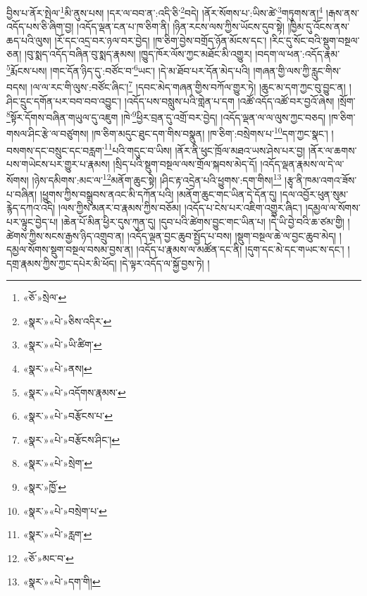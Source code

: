 བྱིས་པ་ནོར་སྤེལ་\footnote{«ཅོ་»སྲེལ་}མི་ནུས་པས། །དར་ལ་བབ་ན་:འདི་ཅི་\footnote{«སྣར་»«པེ་»ཅིས་འདིར་}བདེ། །ནོར་སོགས་པ་:ཡིས་ཚེ་\footnote{«སྣར་»«པེ་»ཡི་ཚིག་}གཏུགས་ན།\footnote{«སྣར་»«པེ་»ནས།} །རྒས་ནས་འདོད་པས་ཅི་ཞིག་བྱ། །འདོད་ལྡན་ངན་པ་ཁ་ཅིག་ནི། །ཉིན་རངས་ལས་ཀྱིས་ཡོངས་དུབ་སྟེ། །ཁྱིམ་དུ་འོངས་ནས་ཆད་པའི་ལུས། །རོ་དང་འདྲ་བར་ཉལ་བར་བྱེད། །ཁ་ཅིག་བྱེས་བགྲོད་ཉོན་མོངས་དང་། །རིང་དུ་སོང་བའི་སྡུག་བསྔལ་ཅན། །བུ་སྨད་འདོད་བཞིན་བུ་སྨད་རྣམས། །ཁྱུད་ཁོར་ལོས་ཀྱང་མཐོང་མི་འགྱུར། །བདག་ལ་ཕན་:འདོད་རྣམ་\footnote{«སྣར་»«པེ་»འདོགས་རྣམས་}རྨོངས་པས། །གང་དོན་ཉིད་དུ་:བཙོང་བ་\footnote{«སྣར་»«པེ་»བརྩོངས་པ་}ཡང་། །དེ་མ་ཐོབ་པར་དོན་མེད་པའི། །གཞན་གྱི་ལས་ཀྱི་རླུང་གིས་བདས། །ལ་ལ་རང་གི་ལུས་:བཙོང་ཞིང་།\footnote{«སྣར་»«པེ་»བརྩོངས་ཤིང་།} །དབང་མེད་གཞན་གྱིས་བཀོལ་གྱུར་ཏེ། །ཆུང་མ་དག་ཀྱང་བུ་བྱུང་ན། །ཤིང་དྲུང་དགོན་པར་བབ་བབ་འབྱུང་། །འདོད་པས་བསླུས་པའི་གླེན་པ་དག །འཚོ་འདོད་འཚོ་བར་བྱའོ་ཞེས། །སྲོག་\footnote{«སྣར་»«པེ་»སྲེག་}སྟོར་དོགས་བཞིན་གཡུལ་དུ་འཇུག །ཁེ་\footnote{«སྣར་»ཁྱོ་}ཕྱིར་བྲན་དུ་འགྲོ་བར་བྱེད། །འདོད་ལྡན་ལ་ལ་ལུས་ཀྱང་བཅད། །ཁ་ཅིག་གསལ་ཤིང་རྩེ་ལ་བཙུགས། །ཁ་ཅིག་མདུང་ཐུང་དག་གིས་བསྣུན། །ཁ་ཅིག་:བསྲེགས་པ་\footnote{«སྣར་»«པེ་»བསྲེག་པ་}དག་ཀྱང་སྣང་། །བསགས་དང་བསྲུང་དང་བརླག་\footnote{«སྣར་»«པེ་»རླག་}པའི་གདུང་བ་ཡིས། །ནོར་ནི་ཕུང་ཁྲོལ་མཐའ་ཡས་ཤེས་པར་བྱ། །ནོར་ལ་ཆགས་པས་གཡེངས་པར་གྱུར་པ་རྣམས། །སྲིད་པའི་སྡུག་བསྔལ་ལས་གྲོལ་སྐབས་མེད་དོ། །འདོད་ལྡན་རྣམས་ལ་དེ་ལ་སོགས། །ཉེས་དམིགས་:མང་ལ་\footnote{«ཅོ་»མང་བ་}མནོག་ཆུང་སྟེ། །ཤིང་རྟ་འདྲེན་པའི་ཕྱུགས་:དག་གིས།\footnote{«སྣར་»«པེ་»དག་གི།} །རྩྭ་ནི་ཁམ་འགའ་ཟོས་པ་བཞིན། །ཕྱུགས་ཀྱིས་བསྒྲུབས་ནའང་མི་དཀོན་པའི། །མནོག་ཆུང་གང་ཡིན་དེ་དོན་དུ། །དལ་འབྱོར་ཕུན་སུམ་རྙེད་དཀའ་འདི། །ལས་ཀྱིས་མནར་བ་རྣམས་ཀྱིས་བཅོམ། །འདོད་པ་ངེས་པར་འཇིག་འགྱུར་ཞིང་། །དམྱལ་ལ་སོགས་པར་ལྟུང་བྱེད་པ། །ཆེན་པོ་མིན་ཕྱིར་དུས་ཀུན་དུ། །དུབ་པའི་ཚེགས་བྱུང་གང་ཡིན་པ། །དེ་ཡི་བྱེ་བའི་ཆ་ཙམ་གྱི། །ཚེགས་ཀྱིས་སངས་རྒྱས་ཉིད་འགྲུབ་ན། །འདོད་ལྡན་བྱང་ཆུབ་སྤྱོད་པ་བས། །སྡུག་བསྔལ་ཆེ་ལ་བྱང་ཆུབ་མེད། །དམྱལ་སོགས་སྡུག་བསྔལ་བསམ་བྱས་ན། །འདོད་པ་རྣམས་ལ་མཚོན་དང་ནི། །དུག་དང་མེ་དང་གཡང་ས་དང་། །དགྲ་རྣམས་ཀྱིས་ཀྱང་དཔེར་མི་ཕོད། །དེ་ལྟར་འདོད་ལ་སྐྱོ་བྱས་ཏེ། །

